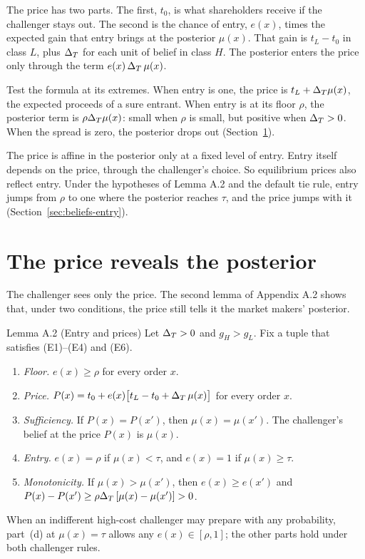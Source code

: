 \begin{intuition}
The price has two parts. The first, \(t_0\), is what shareholders receive if the challenger stays out. The second is the chance of entry, \(e(x)\), times the expected gain that entry brings at the posterior \(\mu(x)\). That gain is \(t_L-t_0\) in class \(L\), plus \(\Delta_T\) for each unit of belief in class \(H\). The posterior enters the price only through the term \(e(x)\,\Delta_T\,\mu(x)\).
\end{intuition}

Test the formula at its extremes. When entry is one, the price is \(t_L+\Delta_T\mu(x)\), the expected proceeds of a sure entrant. When entry is at its floor \(\rho\), the posterior term is \(\rho\Delta_T\mu(x)\): small when \(\rho\) is small, but positive when \(\Delta_T>0\). When the spread is zero, the posterior drops out (Section~\ref{sec:beliefs-reveal}).

\begin{watchout}
The price is affine in the posterior only at a fixed level of entry. Entry itself depends on the price, through the challenger's choice. So equilibrium prices also reflect entry. Under the hypotheses of Lemma A.2 and the default tie rule, entry jumps from \(\rho\) to one where the posterior reaches \(\tau\), and the price jumps with it (Section~\ref{sec:beliefs-entry}).
\end{watchout}

\section{The price reveals the posterior}\label{sec:beliefs-reveal}

The challenger sees only the price. The second lemma of Appendix A.2 shows that, under two conditions, the price still tells it the market makers' posterior.

\begin{paperresult}{Lemma A.2 (Entry and prices)}
Let \(\Delta_T>0\) and \(g_H>g_L\). Fix a tuple that satisfies (E1)--(E4) and (E6).
\begin{enumerate}[label=(\alph*),leftmargin=2em]
\item \emph{Floor.} \(e(x)\ge\rho\) for every order \(x\).
\item \emph{Price.} \(P(x)=t_0+e(x)\bigl[t_L-t_0+\Delta_T\,\mu(x)\bigr]\) for every order \(x\).
\item \emph{Sufficiency.} If \(P(x)=P(x')\), then \(\mu(x)=\mu(x')\). The challenger's belief at the price \(P(x)\) is \(\mu(x)\).
\item \emph{Entry.} \(e(x)=\rho\) if \(\mu(x)<\tau\), and \(e(x)=1\) if \(\mu(x)\ge\tau\).
\item \emph{Monotonicity.} If \(\mu(x)>\mu(x')\), then \(e(x)\ge e(x')\) and \(P(x)-P(x')\ge\rho\Delta_T\,[\mu(x)-\mu(x')]>0\).
\end{enumerate}
When an indifferent high-cost challenger may prepare with any probability, part~(d) at \(\mu(x)=\tau\) allows any \(e(x)\in[\rho,1]\); the other parts hold under both challenger rules.
\end{paperresult}

